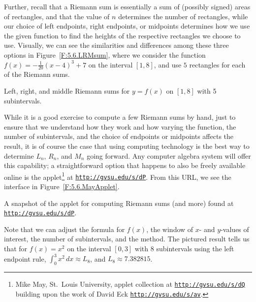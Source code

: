Further, recall that a Riemann sum is essentially a sum of (possibly signed) areas of rectangles, and that the value of $n$ determines the number of rectangles, while our choice of left endpoints, right endpoints, or midpoints determines how we use the given function to find the heights of the respective rectangles we choose to use.  Visually, we can see the similarities and differences among these three options in Figure~\ref{F:5.6.LRMsum}, where we consider the function $f(x) = -\frac{1}{20}(x-4)^3 + 7$ on the interval $[1,8]$, and use $5$ rectangles for each of the Riemann sums.

\begin{marginfigure} %
\caption{Left, right, and middle Riemann sums for $y = f(x)$ on $[1,8]$ with 5 subintervals.} \label{F:5.6.LRMsum}
\end{marginfigure}

While it is a good exercise to compute a few Riemann sums by hand, just to ensure that we understand how they work and how varying the function, the number of subintervals, and the choice of endpoints or midpoints affects the result, it is of course the case that using computing technology is the best way to determine $L_n$, $R_n$, and $M_n$ going forward.  Any computer algebra system will offer this capability; a straightforward option that happens to also be freely available online is the applet\footnote{Mike May, St.~Louis University, applet collection at \href{http://gvsu.edu/s/dQ}{\texttt{http://gvsu.edu/s/dQ}} building upon the work of David Eck \href{http://gvsu.edu/s/av}{\texttt{http://gvsu.edu/s/av}}.} at \href{http://gvsu.edu/s/dP}{\texttt{http://gvsu.edu/s/dP}}.  From this URL, we see the interface in Figure~\ref{F:5.6.MayApplet}.

\begin{marginfigure} %
\caption{A snapshot of the applet for computing Riemann sums (and more) found at \href{http://gvsu.edu/s/dP}{\texttt{http://gvsu.edu/s/dP}}.} \label{F:5.6.MayApplet}
\end{marginfigure}

Note that we can adjust the formula for $f(x)$, the window of $x$- and $y$-values of interest, the number of subintervals, and the method.  The pictured result tells us that for $f(x) = x^2$ on the interval $[0,3]$ with 8 subintervals using the left endpoint rule, $\int_0^3 x^2 \, dx \approx L_8$, and $L_8 \approx 7.382815$.  

